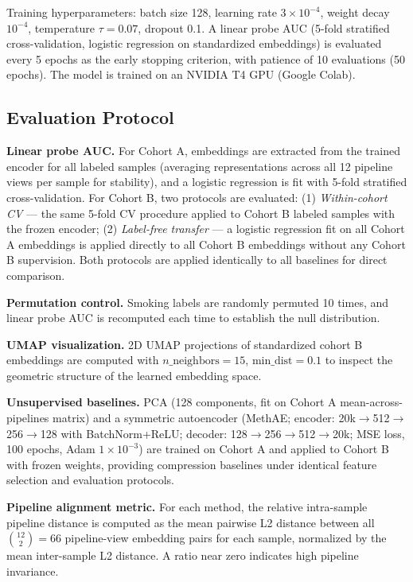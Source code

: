 \documentclass[conference]{IEEEtran}
\begin{document}
Training hyperparameters: batch size 128, learning rate $3 \times 10^{-4}$, weight decay $10^{-4}$, temperature $\tau=0.07$, dropout 0.1. A linear probe AUC (5-fold stratified cross-validation, logistic regression on standardized embeddings) is evaluated every 5 epochs as the early stopping criterion, with patience of 10 evaluations (50 epochs). The model is trained on an NVIDIA T4 GPU (Google Colab).

\subsection{Evaluation Protocol}

\textbf{Linear probe AUC.} For Cohort A, embeddings are extracted from the trained encoder for all labeled samples (averaging representations across all 12 pipeline views per sample for stability), and a logistic regression is fit with 5-fold stratified cross-validation. For Cohort B, two protocols are evaluated: (1) \textit{Within-cohort CV} — the same 5-fold CV procedure applied to Cohort B labeled samples with the frozen encoder; (2) \textit{Label-free transfer} — a logistic regression fit on all Cohort A embeddings is applied directly to all Cohort B embeddings without any Cohort B supervision. Both protocols are applied identically to all baselines for direct comparison.

\textbf{Permutation control.} Smoking labels are randomly permuted 10 times, and linear probe AUC is recomputed each time to establish the null distribution.

\textbf{UMAP visualization.} 2D UMAP projections of standardized cohort B embeddings are computed with $n\_\text{neighbors}=15$, $\text{min\_dist}=0.1$ to inspect the geometric structure of the learned embedding space.

\textbf{Unsupervised baselines.} PCA (128 components, fit on Cohort A mean-across-pipelines matrix) and a symmetric autoencoder (MethAE; encoder: 20k$\to$512$\to$256$\to$128 with BatchNorm+ReLU; decoder: 128$\to$256$\to$512$\to$20k; MSE loss, 100 epochs, Adam $1\times10^{-3}$) are trained on Cohort A and applied to Cohort B with frozen weights, providing compression baselines under identical feature selection and evaluation protocols.

\textbf{Pipeline alignment metric.} For each method, the relative intra-sample pipeline distance is computed as the mean pairwise L2 distance between all $\binom{12}{2}=66$ pipeline-view embedding pairs for each sample, normalized by the mean inter-sample L2 distance. A ratio near zero indicates high pipeline invariance.
\end{document}
